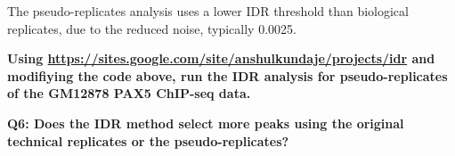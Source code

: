 \documentclass[11pt]{article}
\begin{document}
The pseudo-replicates analysis uses a lower IDR threshold than
biological replicates, due to the reduced noise, typically 0.0025.

\textbf{Using
\url{https://sites.google.com/site/anshulkundaje/projects/idr} and
modifiying the code above, run the IDR analysis for pseudo-replicates of
the GM12878 PAX5 ChIP-seq data.}

\textbf{Q6: Does the IDR method select more peaks using the original
technical replicates or the pseudo-replicates?}


\end{document}
